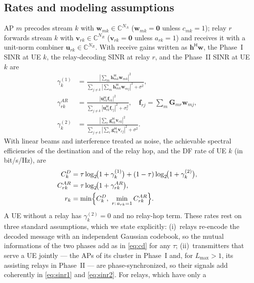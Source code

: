 \documentclass[conference]{IEEEtran}
\newcommand{\abs}[1]{\left\lvert #1 \right\rvert}
\newcommand{\herm}{^{\mathsf{H}}}
\newcommand{\C}{\mathbb{C}}
\begin{document}
\subsection{Rates and modeling assumptions}
AP $m$ precodes stream $k$ with $\mathbf{w}_{mk}\in\C^{N_A}$
($\mathbf{w}_{mk}=\mathbf{0}$ unless $c_{mk}=1$); relay $r$ forwards stream
$k$ with $\mathbf{v}_{rk}\in\C^{N_R}$ ($\mathbf{v}_{rk}=\mathbf{0}$ unless
$a_{rk}=1$) and receives it with a unit-norm combiner
$\mathbf{u}_{rk}\in\C^{N_R}$. With receive gains written as
$\mathbf{h}\herm\mathbf{w}$, the Phase~I SINR at UE $k$, the relay-decoding
SINR at relay $r$, and the Phase~II SINR at UE $k$ are
\begin{align}
\gamma_k^{(1)} &= \frac{\abs{\sum_m \mathbf{h}_{mk}\herm \mathbf{w}_{mk}}^2}
 {\sum_{j\ne k}\abs{\sum_m \mathbf{h}_{mk}\herm \mathbf{w}_{mj}}^2 + \sigma^2},
 \label{eq:sinr1}\\
\gamma_{rk}^{AR} &= \frac{\abs{\mathbf{u}_{rk}\herm \mathbf{f}_{rk}}^2}
 {\sum_{j\ne k}\abs{\mathbf{u}_{rk}\herm \mathbf{f}_{rj}}^2 + \sigma_r^2},
 \quad \mathbf{f}_{rj} = \textstyle\sum_m \mathbf{G}_{mr}\mathbf{w}_{mj},
 \label{eq:sinrAR}\\
\gamma_k^{(2)} &= \frac{\abs{\sum_r \mathbf{g}_{rk}\herm \mathbf{v}_{rk}}^2}
 {\sum_{j\ne k}\abs{\sum_r \mathbf{g}_{rk}\herm \mathbf{v}_{rj}}^2 + \sigma^2}.
 \label{eq:sinr2}
\end{align}
With linear beams and interference treated as noise, the achievable spectral
efficiencies of the destination and of the relay hop, and the DF rate of UE
$k$ (in bit/s/Hz), are
\begin{align}
C_k^{D} &= \tau\log_2\!\bigl(1+\gamma_k^{(1)}\bigr)
          + (1-\tau)\log_2\!\bigl(1+\gamma_k^{(2)}\bigr),\label{eq:cd}\\
C_{rk}^{AR} &= \tau\log_2\!\bigl(1+\gamma_{rk}^{AR}\bigr),\\
r_k &= \min\Bigl\{C_k^{D},\ \min_{r:\,a_{rk}=1} C_{rk}^{AR}\Bigr\}.
\label{eq:dfrate}
\end{align}
A UE without a relay has $\gamma_k^{(2)}=0$ and no relay-hop term. These rates
rest on three standard assumptions, which we state explicitly:
(i)~relays re-encode the decoded message with an independent Gaussian
codebook, so the mutual informations of the two phases add as in
\eqref{eq:cd} for any $\tau$;
(ii)~transmitters that serve a UE jointly --- the APs of its cluster in
Phase~I and, for $L_{\max}>1$, its assisting relays in Phase~II --- are
phase-synchronized, so their signals add coherently in
\eqref{eq:sinr1} and \eqref{eq:sinr2}. For relays, which have only a
\end{document}
